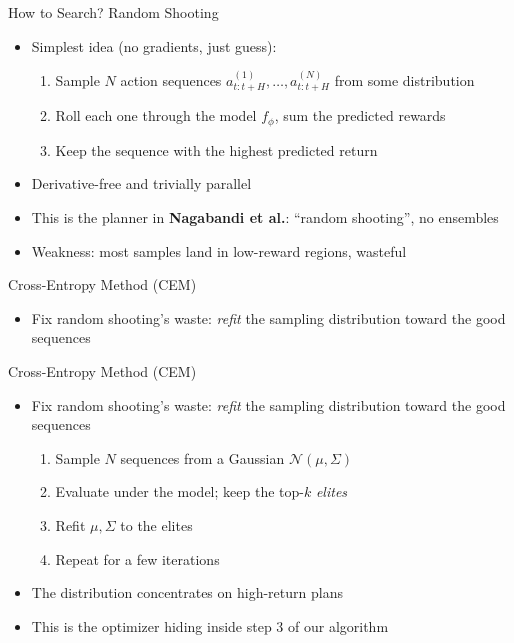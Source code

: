 \begin{frame}{How to Search? Random Shooting}
\begin{itemize}
    \item Simplest idea (no gradients, just guess):
    \begin{enumerate}
        \item Sample $N$ action sequences $a_{t:t+H}^{(1)}, \dots, a_{t:t+H}^{(N)}$
              from some distribution
        \item Roll each one through the model $f_\phi$, sum the predicted rewards
        \item Keep the sequence with the highest predicted return
    \end{enumerate}
    \item Derivative-free and trivially parallel
    \item This is the planner in \textbf{Nagabandi et al.}: ``random shooting'',
          no ensembles
    \item Weakness: most samples land in low-reward regions, wasteful
\end{itemize}
\end{frame}

\begin{frame}{Cross-Entropy Method (CEM)}
\begin{itemize}
    \item Fix random shooting's waste: \emph{refit} the sampling distribution
          toward the good sequences
\end{itemize}
\end{frame}

\begin{frame}{Cross-Entropy Method (CEM)}
\begin{itemize}
    \item Fix random shooting's waste: \emph{refit} the sampling distribution
          toward the good sequences
    \begin{enumerate}
        \item Sample $N$ sequences from a Gaussian $\mathcal{N}(\mu, \Sigma)$
        \item Evaluate under the model; keep the top-$k$ \emph{elites}
        \item Refit $\mu, \Sigma$ to the elites
        \item Repeat for a few iterations
    \end{enumerate}
    \item The distribution concentrates on high-return plans
    \item This is the optimizer hiding inside step 3 of our algorithm
\end{itemize}
\end{frame}

